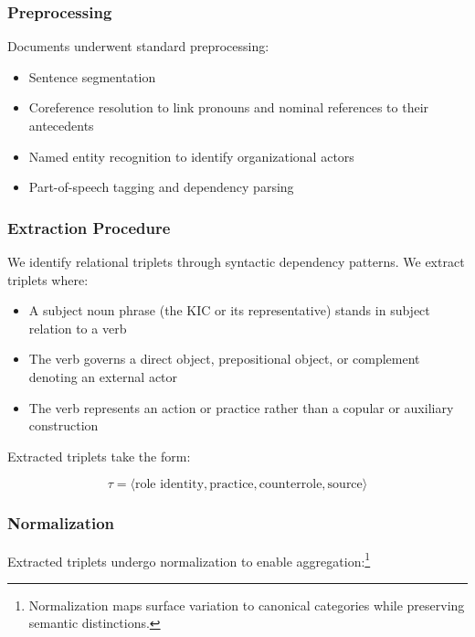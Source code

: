 \documentclass[../main.tex]{subfiles}
\begin{document}
\subsubsection{Preprocessing}

Documents underwent standard preprocessing:

\begin{itemize}
    \item Sentence segmentation
    \item Coreference resolution to link pronouns and nominal references to their antecedents
    \item Named entity recognition to identify organizational actors
    \item Part-of-speech tagging and dependency parsing
\end{itemize}

\subsubsection{Extraction Procedure}

We identify relational triplets through syntactic dependency patterns. We extract triplets where:

\begin{itemize}
    \item A subject noun phrase (the KIC or its representative) stands in subject relation to a verb
    \item The verb governs a direct object, prepositional object, or complement denoting an external actor
    \item The verb represents an action or practice rather than a copular or auxiliary construction
\end{itemize}

Extracted triplets take the form:

\begin{equation}
    \tau = \langle \text{role identity}, \text{practice}, \text{counterrole}, \text{source} \rangle
\end{equation}

\subsubsection{Normalization}

Extracted triplets undergo normalization to enable aggregation:\footnote{Normalization maps surface variation to canonical categories while preserving semantic distinctions.}
\end{document}
